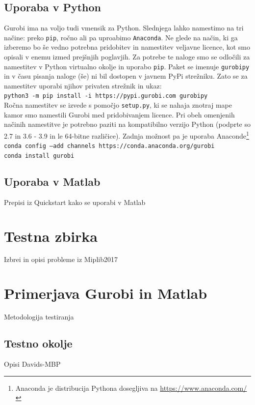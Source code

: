 \documentclass[a4paper,11pt]{article}
\begin{document}
\subsection{Uporaba v Python}
Gurobi ima na voljo tudi vmensik za Python. Slednjega lahko namestimo na tri načine: preko \texttt{pip}, ročno ali pa uproabimo \texttt{Anaconda}. Ne glede na način, ki ga izberemo bo še vedno potrebna pridobitev in namestitev veljavne licence, kot smo opisali v enemu izmed prejšnjih poglavjih. Za potrebe te naloge smo se odločili za namestitev v Python virtualno okolje in uporabo \texttt{pip}. Paket se imenuje \texttt{gurobipy} in v času pisanja naloge (še) ni bil dostopen v javnem PyPi strežniku. Zato se za namestitev uporabi njihov privaten strežnik in ukaz:  \\
\texttt{python3 -m pip install -i https://pypi.gurobi.com gurobipy} \\
Ročna namestitev se izvede s pomočjo \texttt{setup.py}, ki se nahaja znotraj mape kamor smo namestili Gurobi med pridobivanjem licence. Pri obeh omenjenih načinih namestitve je potrebno paziti na kompatibilno verzijo Python (podprte so 2.7 in 3.6 - 3.9 in le 64-bitne različice). Zadnja možnost pa je uporaba Anaconde\footnote{Anaconda je distribucija Pythona dosegljiva na \url{https://www.anaconda.com/}} \\
\texttt{conda config --add channels https://conda.anaconda.org/gurobi} \\
\texttt{conda install gurobi} \\


\subsection{Uporaba v Matlab}
Prepisi iz Quickstart kako se uporabi v Matlab



\section{Testna zbirka}
\label{benchmark_data}
Izbrei in opisi probleme iz Miplib2017



\section{Primerjava Gurobi in Matlab}
Metodologija testiranja

\subsection{Testno okolje}
Opisi Davids-MBP
\end{document}
